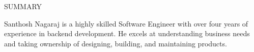 \documentclass{resume} %
\begin{document}

\begin{rSection}{SUMMARY}

{Santhosh Nagaraj is a highly skilled Software Engineer with over four years of experience in backend development. He excels at understanding business needs and taking ownership of designing, building, and maintaining products.}

\end{rSection}

\end{document}
